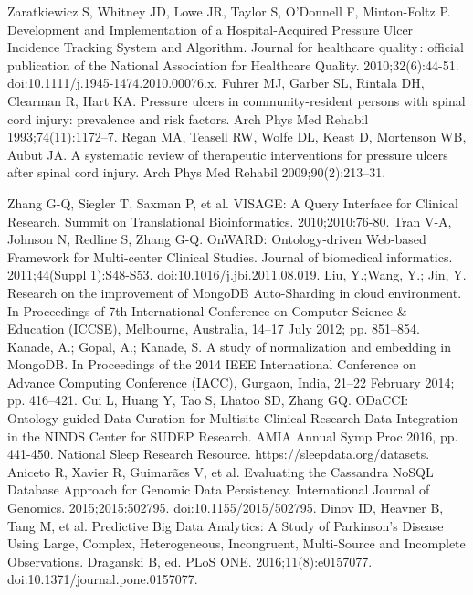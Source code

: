 \documentclass{amia}
\begin{document}
{\begin{thebibliography}{1}
Zaratkiewicz S, Whitney JD, Lowe JR, Taylor S, O’Donnell F, Minton-Foltz P. Development and Implementation of a Hospital-Acquired Pressure Ulcer Incidence Tracking System and Algorithm. Journal for healthcare quality : official publication of the National Association for Healthcare Quality. 2010;32(6):44-51. doi:10.1111/j.1945-1474.2010.00076.x.
Fuhrer MJ, Garber SL, Rintala DH, Clearman R, Hart KA. Pressure ulcers in community-resident persons with spinal cord injury: prevalence and risk factors. Arch Phys Med Rehabil 1993;74(11):1172–7.
Regan MA, Teasell RW, Wolfe DL, Keast D, Mortenson WB, Aubut JA. A systematic review of therapeutic interventions for pressure ulcers after spinal cord injury. Arch Phys Med Rehabil 2009;90(2):213–31.

Zhang G-Q, Siegler T, Saxman P, et al. VISAGE: A Query Interface for Clinical Research. Summit on Translational Bioinformatics. 2010;2010:76-80.
Tran V-A, Johnson N, Redline S, Zhang G-Q. OnWARD: Ontology-driven Web-based Framework for Multi-center Clinical Studies. Journal of biomedical informatics. 2011;44(Suppl 1):S48-S53. doi:10.1016/j.jbi.2011.08.019.
Liu, Y.;Wang, Y.; Jin, Y. Research on the improvement of MongoDB Auto-Sharding in cloud environment. In Proceedings of 7th International Conference on Computer Science \& Education (ICCSE), Melbourne, Australia, 14–17 July 2012; pp. 851–854.
Kanade, A.; Gopal, A.; Kanade, S. A study of normalization and embedding in MongoDB. In Proceedings of the 2014 IEEE International Conference on Advance Computing Conference (IACC), Gurgaon, India, 21–22 February 2014; pp. 416–421.
Cui L, Huang Y, Tao S, Lhatoo SD, Zhang GQ. ODaCCI: Ontology-guided Data Curation for Multisite Clinical Research Data Integration in the NINDS Center for SUDEP Research. AMIA Annual Symp Proc 2016, pp. 441-450.
National Sleep Research Resource. https://sleepdata.org/datasets.
Aniceto R, Xavier R, Guimarães V, et al. Evaluating the Cassandra NoSQL Database Approach for Genomic Data Persistency. International Journal of Genomics. 2015;2015:502795. doi:10.1155/2015/502795.
Dinov ID, Heavner B, Tang M, et al. Predictive Big Data Analytics: A Study of Parkinson’s Disease Using Large, Complex, Heterogeneous, Incongruent, Multi-Source and Incomplete Observations. Draganski B, ed. PLoS ONE. 2016;11(8):e0157077. doi:10.1371/journal.pone.0157077.

\end{thebibliography}
}
\end{document}
